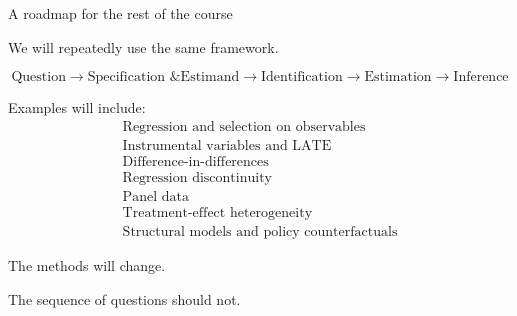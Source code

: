 \documentclass[aspectratio=169,11pt]{beamer}
\begin{document}
\begin{frame}{A roadmap for the rest of the course}

We will repeatedly use the same framework.

\[
\boxed{
\text{Question}
\rightarrow
\text{Specification \& Estimand}
\rightarrow
\text{Identification}
\rightarrow
\text{Estimation}
\rightarrow
\text{Inference}
}
\]

Examples will include:
\[
\begin{array}{c}
\text{Regression and selection on observables}\\
\text{Instrumental variables and LATE}\\
\text{Difference-in-differences}\\
\text{Regression discontinuity}\\
\text{Panel data}\\
\text{Treatment-effect heterogeneity}\\
\text{Structural models and policy counterfactuals}
\end{array}
\]

The methods will change.

The sequence of questions should not.

\end{frame}
\end{document}
